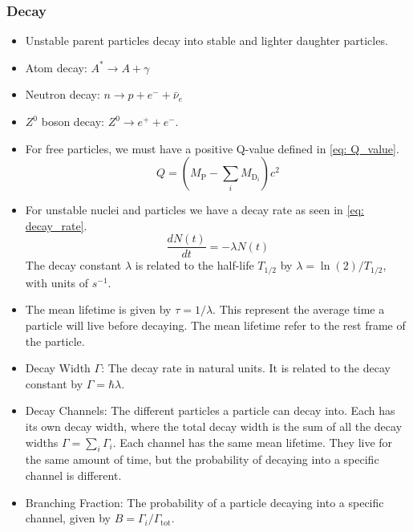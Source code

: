 \subsubsection{Decay}
\begin{itemize}
    \item Unstable parent particles decay into stable and lighter daughter particles. 
    \item Atom decay: $A^{*} → A + γ$
    \item Neutron decay: $n → p + e^{-} + \bar{ν}_{e}$
    \item $Z^{0}$ boson decay: $Z^{0} → e^{+} + e^{-}$. 
    \item For free particles, we must have a positive Q-value defined in \cref{eq: Q_value}.
    \begin{equation}\label{eq: Q_value}
        Q = \left(M_{\text{P}} - ∑_{i}^{} M_{\text{D}_i}\right)c^2
    \end{equation} 
    \item For unstable nuclei and particles we have a decay rate as seen in \cref{eq: decay_rate}.
    \begin{equation}\label{eq: decay_rate}
        \frac{dN(t)}{dt} = -λN(t)
    \end{equation}
    The decay constant $λ$ is related to the half-life $T_{1/2}$ by $λ = \ln(2) / T_{1/2}$, with units of $s^{-1}$. 
    \item The mean lifetime is given by $τ = 1 / λ$. This represent the average time a particle will live before decaying. The mean lifetime refer to the rest frame of the particle. 
    \item Decay Width $Γ$: The decay rate in natural units. It is related to the decay constant by $Γ = ℏλ$.
    \item Decay Channels: The different particles a particle can decay into. Each has its own decay width, where the total decay width is the sum of all the decay widths $Γ = ∑_{i}^{} Γ_i$. Each channel has the same mean lifetime. They live for the same amount of time, but the probability of decaying into a specific channel is different. 
    \item Branching Fraction: The probability of a particle decaying into a specific channel, given by $B = Γ_{i} / Γ_{\text{tot}}$.
\end{itemize}




